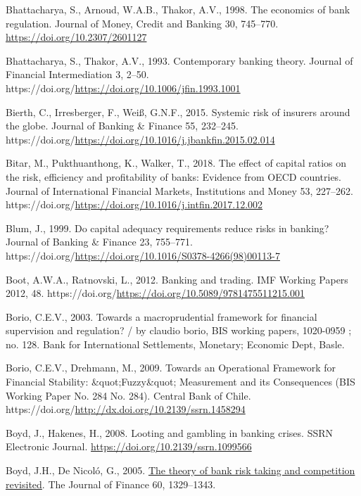 \documentclass[
  12pt,
  a4paper,
]{scrreprt}
\newlength{\cslhangindent}
\newenvironment{CSLReferences}[2] %
 {\begin{list}{}{%
  \setlength{\itemindent}{0pt}
  \setlength{\leftmargin}{0pt}
  \setlength{\parsep}{0pt}
  \ifodd #1
   \setlength{\leftmargin}{\cslhangindent}
   \setlength{\itemindent}{-1\cslhangindent}
  \fi
  \setlength{\itemsep}{#2\baselineskip}}}
 {\end{list}}
\begin{document}
\begin{CSLReferences}{1}{0}
Bhattacharya, S., Arnoud, W.A.B., Thakor, A.V., 1998. The economics of
bank regulation. Journal of Money, Credit and Banking 30, 745--770.
\url{https://doi.org/10.2307/2601127}

Bhattacharya, S., Thakor, A.V., 1993. Contemporary banking theory.
Journal of Financial Intermediation 3, 2--50.
https://doi.org/\url{https://doi.org/10.1006/jfin.1993.1001}

Bierth, C., Irresberger, F., Weiß, G.N.F., 2015. Systemic risk of
insurers around the globe. Journal of Banking \& Finance 55, 232--245.
https://doi.org/\url{https://doi.org/10.1016/j.jbankfin.2015.02.014}

Bitar, M., Pukthuanthong, K., Walker, T., 2018. The effect of capital
ratios on the risk, efficiency and profitability of banks: Evidence from
OECD countries. Journal of International Financial Markets, Institutions
and Money 53, 227--262.
https://doi.org/\url{https://doi.org/10.1016/j.intfin.2017.12.002}

Blum, J., 1999. Do capital adequacy requirements reduce risks in
banking? Journal of Banking \& Finance 23, 755--771.
https://doi.org/\url{https://doi.org/10.1016/S0378-4266(98)00113-7}

Boot, A.W.A., Ratnovski, L., 2012. Banking and trading. IMF Working
Papers 2012, 48.
https://doi.org/\url{https://doi.org/10.5089/9781475511215.001}

Borio, C.E.V., 2003. Towards a macroprudential framework for financial
supervision and regulation? / by claudio borio, BIS working papers,
1020-0959 ; no. 128. Bank for International Settlements, Monetary;
Economic Dept, Basle.

Borio, C.E.V., Drehmann, M., 2009. {Towards an Operational Framework for
Financial Stability: \&quot;Fuzzy\&quot; Measurement and its
Consequences} (BIS Working Paper No. 284 No. 284). Central Bank of
Chile. https://doi.org/\url{http://dx.doi.org/10.2139/ssrn.1458294}

Boyd, J., Hakenes, H., 2008. Looting and gambling in banking crises.
SSRN Electronic Journal. \url{https://doi.org/10.2139/ssrn.1099566}

Boyd, J.H., De Nicoló, G., 2005.
\href{http://www.jstor.org.queens.ezp1.qub.ac.uk/stable/3694928}{The
theory of bank risk taking and competition revisited}. The Journal of
Finance 60, 1329--1343.


\end{CSLReferences}
\end{document}
